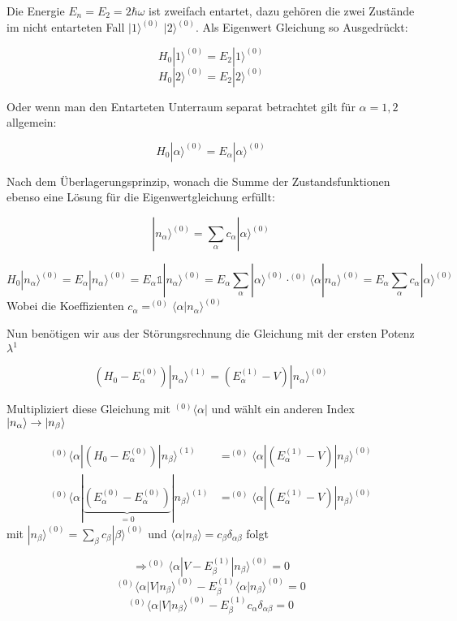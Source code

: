 Die Energie \(E_n = E_2 = 2\hbar\omega\) ist zweifach entartet, dazu gehören die zwei Zustände im nicht entarteten Fall \(|1\rangle^{(0)} \)  \(|2\rangle^{(0)} \). Als Eigenwert Gleichung so Ausgedrückt:

\[H_0 |1\rangle^{(0)} = E_2 |1\rangle^{(0)} \]
\[H_0 |2\rangle^{(0)} = E_2 |2\rangle^{(0)} \]

Oder wenn man den Entarteten Unterraum separat betrachtet gilt für \(\alpha=1,2\) allgemein:

\[H_0 |\alpha\rangle^{(0)} = E_\alpha |\alpha\rangle^{(0)} \]

Nach dem Überlagerungsprinzip, wonach die Summe der Zustandsfunktionen ebenso eine Lösung für die Eigenwertgleichung erfüllt:

\[|n_\alpha\rangle^{(0)} = \sum_\alpha c_\alpha |\alpha\rangle ^{(0)}\]

\[H_0 |n_\alpha \rangle^{(0)} = E_\alpha |n_\alpha\rangle^{(0)} = E_\alpha \mathbb 1 |n_\alpha\rangle^{(0)} =  E_\alpha \sum_\alpha |\alpha\rangle^{(0)} \cdot^{(0)}\langle \alpha |n_\alpha\rangle^{(0)} = E_\alpha \sum_\alpha c_\alpha|\alpha\rangle ^{(0)} \]
Wobei die Koeffizienten \(c_\alpha =  ^{(0)} \langle \alpha |n_\alpha\rangle^{(0)}\)

Nun benötigen wir aus der Störungsrechnung die Gleichung mit der ersten Potenz \(\lambda^1\)

\[(H_0-E_\alpha^{(0)})|n_\alpha\rangle ^{(1)} = (E_\alpha^{(1)}-V)|n_\alpha\rangle^{(0)}\]

Multipliziert diese Gleichung mit \(^{(0)}\langle \alpha|\) und wählt ein anderen Index \(\left| n_\alpha \right\rangle\to\left| n_\beta \right\rangle\)

\begin{align}
^{(0)}\langle \alpha|(H_0-E_\alpha^{(0)})|n_\beta\rangle ^{(1)} &= ^{(0)}\langle \alpha|(E_\alpha^{(1)}-V)|n_\beta\rangle^{(0)}\\
^{(0)}\langle \alpha|\underbrace{(E_\alpha^{(0)}-E_\alpha^{(0)})}_{=0}|n_\beta\rangle ^{(1)} &=^{(0)}\langle \alpha| (E_\alpha^{(1)}-V)|n_\beta\rangle^{(0)}
\end{align}
mit \(|n_\beta \rangle^{(0)} = \sum_\beta c_\beta |\beta\rangle ^{(0)} \) und \(\langle \alpha|n_\beta\rangle = c_\beta\delta_{\alpha\beta}\) folgt

\[\Rightarrow  ^{(0)} \langle \alpha|V-E_\beta^{(1)}|n_\beta\rangle^{(0)} = 0 \]
\[  ^{(0)} \langle \alpha|V|n_\beta\rangle^{(0)} -E_\beta^{(1)} \langle \alpha|n_\beta\rangle^{(0)}  = 0 \]
\[  ^{(0)} \langle \alpha|V|n_\beta\rangle^{(0)} -E_\beta^{(1)} c_\alpha  \delta_{\alpha\beta}  = 0 \]


